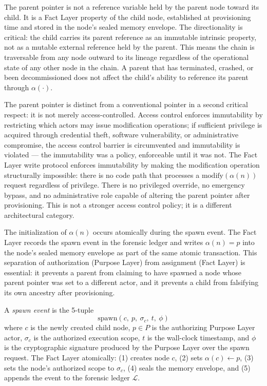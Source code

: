 The parent pointer is not a reference variable held by the parent node toward its child. It is a Fact Layer property of the child node, established at provisioning time and stored in the node's sealed memory envelope. The directionality is critical: the child carries its parent reference as an immutable intrinsic property, not as a mutable external reference held by the parent. This means the chain is traversable from any node outward to its lineage regardless of the operational state of any other node in the chain. A parent that has terminated, crashed, or been decommissioned does not affect the child's ability to reference its parent through $\alpha(\cdot)$.

The parent pointer is distinct from a conventional pointer in a second critical respect: it is not merely access-controlled. Access control enforces immutability by restricting which actors may issue modification operations; if sufficient privilege is acquired through credential theft, software vulnerability, or administrative compromise, the access control barrier is circumvented and immutability is violated --- the immutability was a policy, enforceable until it was not. The Fact Layer write protocol enforces immutability by making the modification operation structurally impossible: there is no code path that processes a $\mathrm{modify}(\alpha(n))$ request regardless of privilege. There is no privileged override, no emergency bypass, and no administrative role capable of altering the parent pointer after provisioning. This is not a stronger access control policy; it is a different architectural category.

The initialization of $\alpha(n)$ occurs atomically during the spawn event. The Fact Layer records the spawn event in the forensic ledger and writes $\alpha(n) = p$ into the node's sealed memory envelope as part of the same atomic transaction. This separation of authorization (Purpose Layer) from assignment (Fact Layer) is essential: it prevents a parent from claiming to have spawned a node whose parent pointer was set to a different actor, and it prevents a child from falsifying its own ancestry after provisioning.

\begin{dfn}
\label{dfn:spawn-event}
A \emph{spawn event} is the 5-tuple
\begin{equation}
\mathrm{spawn}(c,\ p,\ \sigma_c,\ t,\ \phi)
\end{equation}
where $c$ is the newly created child node, $p \in P$ is the authorizing Purpose Layer actor, $\sigma_c$ is the authorized execution scope, $t$ is the wall-clock timestamp, and $\phi$ is the cryptographic signature produced by the Purpose Layer over the spawn request. The Fact Layer atomically: (1) creates node $c$, (2) sets $\alpha(c) \leftarrow p$, (3) sets the node's authorized scope to $\sigma_c$, (4) seals the memory envelope, and (5) appends the event to the forensic ledger $\mathcal{L}$.
\end{dfn}

